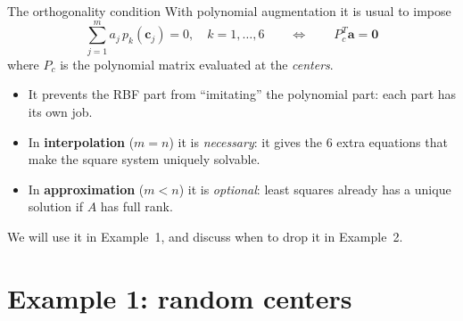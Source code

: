 \documentclass[10pt,aspectratio=169]{beamer}
\newcommand{\hl}[1]{\textcolor{accent}{\textbf{#1}}}
\newcommand{\cc}{\bm{c}}
\begin{document}
\begin{frame}{The orthogonality condition}
  With polynomial augmentation it is usual to impose
  \[
    \sum_{j=1}^{m} a_j\, p_k(\cc_j) = 0, \quad k=1,\dots,6
    \qquad\Longleftrightarrow\qquad
    P_c^{T}\bm{a} = \bm{0}
  \]
  where $P_c$ is the polynomial matrix evaluated at the \emph{centers}.
  \vspace{0.5em}
  \begin{itemize}
    \item It prevents the RBF part from ``imitating'' the polynomial part:
          each part has its own job.
    \item In \hl{interpolation} ($m = n$) it is \emph{necessary}: it gives the
          6 extra equations that make the square system uniquely solvable.
    \item In \hl{approximation} ($m < n$) it is \emph{optional}: least squares
          already has a unique solution if $A$ has full rank.
  \end{itemize}
  \vspace{0.5em}
  We will use it in Example~1, and discuss when to drop it in Example~2.
\end{frame}

\section{Example 1: random centers}
\end{document}
